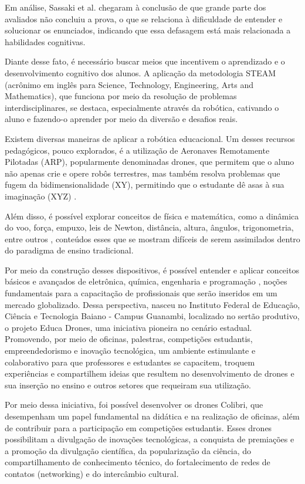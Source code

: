 \documentclass[conference]{IEEEtran}
\begin{document}
Em análise, Sassaki et al. \cite{a2} chegaram à conclusão de que grande parte dos avaliados não concluiu a prova, o que se relaciona à dificuldade de entender e solucionar os enunciados, indicando que essa defasagem está mais relacionada a habilidades cognitivas.

Diante desse fato, é necessário buscar meios que incentivem o aprendizado e o desenvolvimento cognitivo dos alunos. A aplicação da metodologia STEAM (acrônimo em inglês para Science, Technology, Engineering, Arts and Mathematics), que funciona por meio da resolução de problemas interdisciplinares, se destaca, especialmente através da robótica, cativando o aluno e fazendo-o aprender por meio da diversão e desafios reais.

Existem diversas maneiras de aplicar a robótica educacional. Um desses recursos pedagógicos, pouco explorados, é a utilização de Aeronaves Remotamente Pilotadas (ARP), popularmente denominadas drones, que permitem que o aluno não apenas crie e opere robôs terrestres, mas também resolva problemas que fugem da bidimensionalidade (XY), permitindo que o estudante dê asas à sua imaginação (XYZ) \cite{a3}.

Além disso, é possível explorar conceitos de física e matemática, como a dinâmica do voo, força, empuxo, leis de Newton, distância, altura, ângulos, trigonometria, entre outros \cite{b11}, conteúdos esses que se mostram difíceis de serem assimilados dentro do paradigma de ensino tradicional.

Por meio da construção desses dispositivos, é possível entender e aplicar conceitos básicos e avançados de eletrônica, química, engenharia e programação \cite{b12}, noções fundamentais para a capacitação de profissionais que serão inseridos em um mercado globalizado. Dessa perspectiva, nasceu no Instituto Federal de Educação, Ciência e Tecnologia Baiano - Campus Guanambi, localizado no sertão produtivo, o projeto Educa Drones, uma iniciativa pioneira no cenário estadual. Promovendo, por meio de oficinas, palestras, competições estudantis, empreendedorismo e inovação tecnológica, um ambiente estimulante e colaborativo para que professores e estudantes se capacitem, troquem experiências e compartilhem ideias que resultem no desenvolvimento de drones e sua inserção no ensino e outros setores que requeiram sua utilização.

Por meio dessa iniciativa, foi possível desenvolver os drones Colibri, que desempenham um papel fundamental na didática e na realização de oficinas, além de contribuir para a participação em competições estudantis. Esses drones possibilitam a divulgação de inovações tecnológicas, a conquista de premiações e a promoção da divulgação científica, da popularização da ciência, do compartilhamento de conhecimento técnico, do fortalecimento de redes de contatos (networking) e do intercâmbio cultural.
\end{document}
